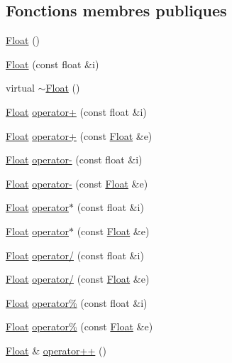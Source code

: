 \subsection*{Fonctions membres publiques}
\begin{DoxyCompactItemize}
\item 
\hyperlink{class_float_af137dbc793f0678dda40b35b46d2c8c1}{Float} ()
\item 
\hyperlink{class_float_a1af3edf1b1def9e037aee6a23f7dd3fe}{Float} (const float \&i)
\item 
virtual \hyperlink{class_float_ac45409abc74786e686cf829c4876a0aa}{$\sim$\-Float} ()
\item 
\hyperlink{class_float}{Float} \hyperlink{class_float_a8a3c435dd4a8876e5f5b5e46017e7394}{operator+} (const float \&i)
\item 
\hyperlink{class_float}{Float} \hyperlink{class_float_a4c9b974c747319474ad78fa4904142fd}{operator+} (const \hyperlink{class_float}{Float} \&e)
\item 
\hyperlink{class_float}{Float} \hyperlink{class_float_a3f90a63ad65b9e64dcfd3d25bff63044}{operator-\/} (const float \&i)
\item 
\hyperlink{class_float}{Float} \hyperlink{class_float_ae7deb493a7109c8630c9efde48459324}{operator-\/} (const \hyperlink{class_float}{Float} \&e)
\item 
\hyperlink{class_float}{Float} \hyperlink{class_float_aeddcfb21e099ca1dca7bfb01b1b940da}{operator$\ast$} (const float \&i)
\item 
\hyperlink{class_float}{Float} \hyperlink{class_float_a7c419e58473a3999e3150f24c21751fc}{operator$\ast$} (const \hyperlink{class_float}{Float} \&e)
\item 
\hyperlink{class_float}{Float} \hyperlink{class_float_afa3921fc34b380a4585e20a871c62a04}{operator/} (const float \&i)
\item 
\hyperlink{class_float}{Float} \hyperlink{class_float_a7a3505f902424b8b28b951c3d8821092}{operator/} (const \hyperlink{class_float}{Float} \&e)
\item 
\hyperlink{class_float}{Float} \hyperlink{class_float_a6dd062495cb347e578eb1358bd148652}{operator\%} (const float \&i)
\item 
\hyperlink{class_float}{Float} \hyperlink{class_float_a3c147fcf9399759d332fa1cbd639a6bd}{operator\%} (const \hyperlink{class_float}{Float} \&e)
\item 
\hyperlink{class_float}{Float} \& \hyperlink{class_float_a48358fec8b2e99f931c5bf58974702e8}{operator++} ()
\item 

\end{DoxyCompactItemize}
